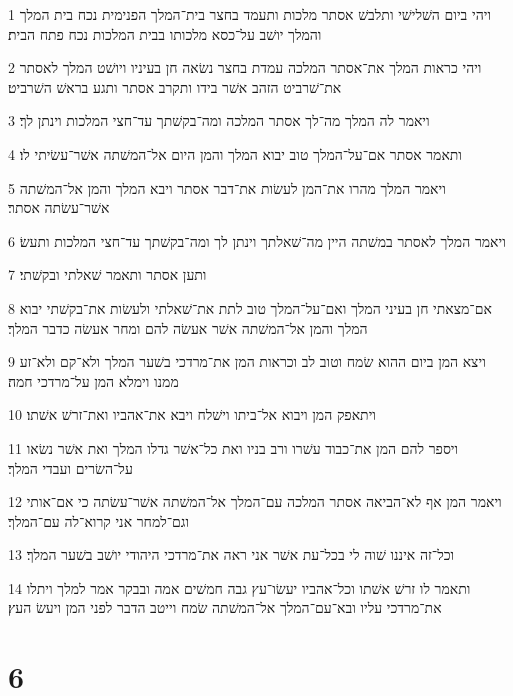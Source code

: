 \par 1 ויהי ביום השׁלישׁי ותלבשׁ אסתר מלכות ותעמד בחצר בית־המלך הפנימית נכח בית המלך והמלך יושׁב על־כסא מלכותו בבית המלכות נכח פתח הבית׃
\par 2 ויהי כראות המלך את־אסתר המלכה עמדת בחצר נשׂאה חן בעיניו ויושׁט המלך לאסתר את־שׁרביט הזהב אשׁר בידו ותקרב אסתר ותגע בראשׁ השׁרביט׃
\par 3 ויאמר לה המלך מה־לך אסתר המלכה ומה־בקשׁתך עד־חצי המלכות וינתן לך׃
\par 4 ותאמר אסתר אם־על־המלך טוב יבוא המלך והמן היום אל־המשׁתה אשׁר־עשׂיתי לו׃
\par 5 ויאמר המלך מהרו את־המן לעשׂות את־דבר אסתר ויבא המלך והמן אל־המשׁתה אשׁר־עשׂתה אסתר׃
\par 6 ויאמר המלך לאסתר במשׁתה היין מה־שׁאלתך וינתן לך ומה־בקשׁתך עד־חצי המלכות ותעשׂ׃
\par 7 ותען אסתר ותאמר שׁאלתי ובקשׁתי׃
\par 8 אם־מצאתי חן בעיני המלך ואם־על־המלך טוב לתת את־שׁאלתי ולעשׂות את־בקשׁתי יבוא המלך והמן אל־המשׁתה אשׁר אעשׂה להם ומחר אעשׂה כדבר המלך׃
\par 9 ויצא המן ביום ההוא שׂמח וטוב לב וכראות המן את־מרדכי בשׁער המלך ולא־קם ולא־זע ממנו וימלא המן על־מרדכי חמה׃
\par 10 ויתאפק המן ויבוא אל־ביתו וישׁלח ויבא את־אהביו ואת־זרשׁ אשׁתו׃
\par 11 ויספר להם המן את־כבוד עשׁרו ורב בניו ואת כל־אשׁר גדלו המלך ואת אשׁר נשׂאו על־השׂרים ועבדי המלך׃
\par 12 ויאמר המן אף לא־הביאה אסתר המלכה עם־המלך אל־המשׁתה אשׁר־עשׂתה כי אם־אותי וגם־למחר אני קרוא־לה עם־המלך׃
\par 13 וכל־זה איננו שׁוה לי בכל־עת אשׁר אני ראה את־מרדכי היהודי יושׁב בשׁער המלך׃
\par 14 ותאמר לו זרשׁ אשׁתו וכל־אהביו יעשׂו־עץ גבה חמשׁים אמה ובבקר אמר למלך ויתלו את־מרדכי עליו ובא־עם־המלך אל־המשׁתה שׂמח וייטב הדבר לפני המן ויעשׂ העץ׃

\chapter{6}

